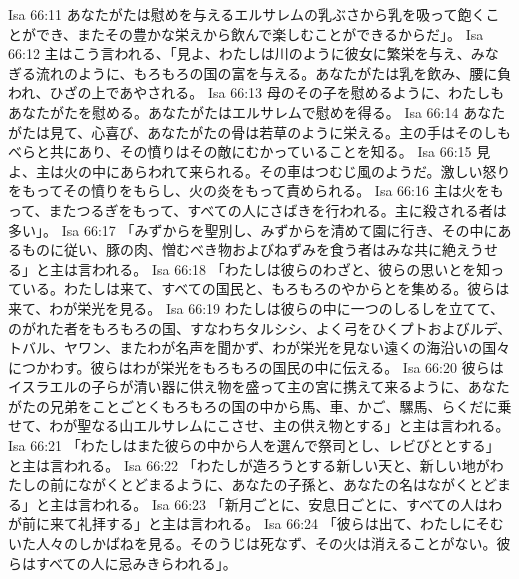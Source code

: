 Isa 66:11  あなたがたは慰めを与えるエルサレムの乳ぶさから乳を吸って飽くことができ、またその豊かな栄えから飲んで楽しむことができるからだ」。
Isa 66:12  主はこう言われる、「見よ、わたしは川のように彼女に繁栄を与え、みなぎる流れのように、もろもろの国の富を与える。あなたがたは乳を飲み、腰に負われ、ひざの上であやされる。
Isa 66:13  母のその子を慰めるように、わたしもあなたがたを慰める。あなたがたはエルサレムで慰めを得る。
Isa 66:14  あなたがたは見て、心喜び、あなたがたの骨は若草のように栄える。主の手はそのしもべらと共にあり、その憤りはその敵にむかっていることを知る。
Isa 66:15  見よ、主は火の中にあらわれて来られる。その車はつむじ風のようだ。激しい怒りをもってその憤りをもらし、火の炎をもって責められる。
Isa 66:16  主は火をもって、またつるぎをもって、すべての人にさばきを行われる。主に殺される者は多い」。
Isa 66:17  「みずからを聖別し、みずからを清めて園に行き、その中にあるものに従い、豚の肉、憎むべき物およびねずみを食う者はみな共に絶えうせる」と主は言われる。
Isa 66:18  「わたしは彼らのわざと、彼らの思いとを知っている。わたしは来て、すべての国民と、もろもろのやからとを集める。彼らは来て、わが栄光を見る。
Isa 66:19  わたしは彼らの中に一つのしるしを立てて、のがれた者をもろもろの国、すなわちタルシシ、よく弓をひくプトおよびルデ、トバル、ヤワン、またわが名声を聞かず、わが栄光を見ない遠くの海沿いの国々につかわす。彼らはわが栄光をもろもろの国民の中に伝える。
Isa 66:20  彼らはイスラエルの子らが清い器に供え物を盛って主の宮に携えて来るように、あなたがたの兄弟をことごとくもろもろの国の中から馬、車、かご、騾馬、らくだに乗せて、わが聖なる山エルサレムにこさせ、主の供え物とする」と主は言われる。
Isa 66:21  「わたしはまた彼らの中から人を選んで祭司とし、レビびととする」と主は言われる。
Isa 66:22  「わたしが造ろうとする新しい天と、新しい地がわたしの前にながくとどまるように、あなたの子孫と、あなたの名はながくとどまる」と主は言われる。
Isa 66:23  「新月ごとに、安息日ごとに、すべての人はわが前に来て礼拝する」と主は言われる。
Isa 66:24  「彼らは出て、わたしにそむいた人々のしかばねを見る。そのうじは死なず、その火は消えることがない。彼らはすべての人に忌みきらわれる」。


